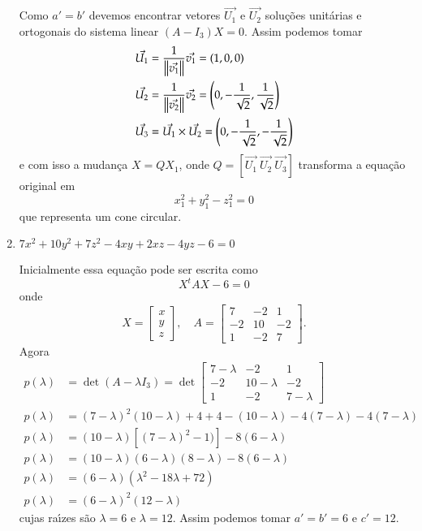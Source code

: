 \begin{exemplos}
\begin{enumerate}
\begin{solucao}
			Como $a' = b'$ devemos encontrar vetores $\vec{U_1}$ e $\vec{U_2}$ solu\c{c}\~oes unit\'arias e ortogonais do sistema linear $(A -I_3)X = 0$. Assim podemos tomar
			\begin{align*}
				\vec{U_1} &= \dfrac{1}{\left\Vert{\vec{v_1}}\right\Vert}\vec{v_1} = (1,0,0)\\
				\vec{U_2} &= \dfrac{1}{\left\Vert{\vec{v_2}}\right\Vert}\vec{v_2} = \left(0,-\dfrac{1}{\sqrt{2}},\dfrac{1}{\sqrt{2}}\right)\\
				\vec{U_3} &= \vec{U_1}\times\vec{U_2} = \left(0,-\dfrac{1}{\sqrt{2}},-\dfrac{1}{\sqrt{2}}\right)
			\end{align*}
			e com  isso a mudan\c{c}a $X = QX_1$, onde $Q = [\vec{U_1}\ \vec{U_2}\ \vec{U_3}]$ transforma a equa\c{c}\~ao original em
			\[
				x_1^2 + y_1^2 - z_1^2 = 0
			\]
			que representa um cone circular.
		\end{solucao}

		\item $7x^2 + 10y^2 + 7z^2 - 4xy + 2xz - 4yz - 6 = 0$
		\begin{solucao}
			Inicialmente essa equa\c{c}\~ao pode ser escrita como
			\[
				X^tAX - 6 = 0
			\]
			onde
			\[
				X = \begin{bmatrix}
					x\\ y\\ z
				\end{bmatrix},\quad A = \begin{bmatrix}
					7 & -2 & 1\\
					-2 & 10 & -2\\
					1 & -2 & 7
				\end{bmatrix}.
			\]
			Agora
			\begin{align*}
				p(\lambda) &= \det(A - \lambda I_3) = \det \begin{bmatrix}
					7 - \lambda & -2 & 1\\
					-2 & 10 -\lambda & -2\\
					1 & -2 & 7 -\lambda
				\end{bmatrix}\\
				p(\lambda) &= (7 - \lambda)^2(10 - \lambda) + 4 + 4 - (10 - \lambda) - 4(7 - \lambda) - 4(7 - \lambda)\\
				p(\lambda) &= (10 - \lambda)[(7 - \lambda)^2 - 1)] - 8(6 - \lambda)\\
				p(\lambda) &= (10 - \lambda)(6 - \lambda)(8 - \lambda) - 8(6 - \lambda)\\
				p(\lambda) &= (6 - \lambda)(\lambda^2 - 18\lambda + 72)\\
				p(\lambda) &= (6 - \lambda)^2(12 - \lambda)
			\end{align*}
			cujas ra{\'\i}zes s\~ao $\lambda = 6$ e $\lambda = 12$. Assim podemos tomar $a' = b' = 6$ e $c' = 12$.


\end{solucao}
\end{enumerate}
\end{exemplos}
